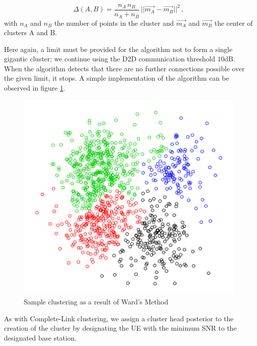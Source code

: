 \begin{equation}\label{eq:wards_cost}
\Delta(A,B) = \frac {n_A\,n_B}{n_A + n_B}\,||\vec{m_A} - \vec{m_B}||^2\,,
\end{equation}
with $n_A$ and $n_B$ the number of points in the cluster and $\vec{m_A}$ and $\vec{m_B}$ the center of clusters A and B. 

Here again, a limit must be provided for the algorithm not to form a single gigantic cluster; we continue using the D2D communication threshold $10 \text{dB}$. When the algorithm detects that there are no further connections possible over the given limit, it stops. A simple implementation of the algorithm can be observed in figure \ref{fig:ward_math}.

\begin{figure}[H]
\centering
\includegraphics[width=.4\linewidth]{figures/ward_math}
\caption{Sample clustering as a result of Ward's Method \cite{Shalizi2009}}
\label{fig:ward_math}
\end{figure}

As with Complete-Link clustering, we assign a cluster head posterior to the creation of the cluster by designating the UE with the minimum SNR to the designated base station.